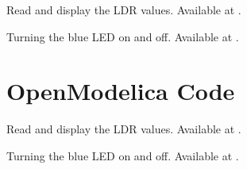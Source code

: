 \begin{juliacode}
{Read and display the LDR values.  Available at
  .}
\label{julia:ldr-read}

\end{juliacode}

\begin{juliacode}
{Turning the blue LED on and off.  Available at
  .}
\label{julia:ldr-led}

\end{juliacode}


\section{OpenModelica Code}
\label{sec:ldr-OpenModelica-code}

\begin{OpenModelicacode}
{Read and display the LDR values.  Available at
  .}
\label{OpenModelica:ldr-read}

\end{OpenModelicacode}

\begin{OpenModelicacode}
{Turning the blue LED on and off.  Available at
  .}
\label{OpenModelica:ldr-led}

\end{OpenModelicacode}
